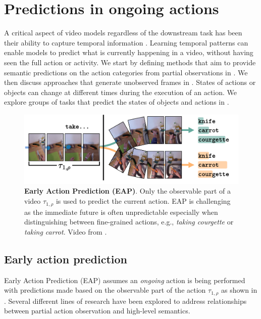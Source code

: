 \section{Predictions in ongoing actions}
\label{sec:prediction}

A critical aspect of video models regardless of the downstream task has been their ability to capture temporal information \citep{huang2018makes}. Learning temporal patterns can enable models to predict what is currently happening in a video, without having seen the full action or activity. We start by defining methods that aim to provide semantic predictions on the action categories from partial observations in . We then discuss approaches that generate unobserved frames in . States of actions or objects can change at different times during the execution of an action. We explore groups of tasks that predict the states of objects and actions in . 

\begin{figure}[t]
    \centering
    \includegraphics[width=\linewidth]{figs/EAP.pdf}
    \caption{\textbf{Early Action Prediction (EAP)}. Only the observable part of a video $\tau_{1,\rho}$ is used to predict the current action. EAP is challenging as the immediate future is often unpredictable especially when distinguishing between fine-grained actions, e.g., \textit{taking courgette} or \textit{taking carrot}. Video from \citet{damen2022rescaling}.}
    \label{fig:EAP_overview}
\end{figure}


\subsection{Early action prediction}
\label{sec:prediction::EAP}

Early Action Prediction (EAP) assumes an \emph{ongoing} action is being performed with predictions made based on the observable part of the action $\tau_{1,\rho}$ as shown in . %
Several different lines of research have been explored to address relationships between partial action observation and high-level semantics.

